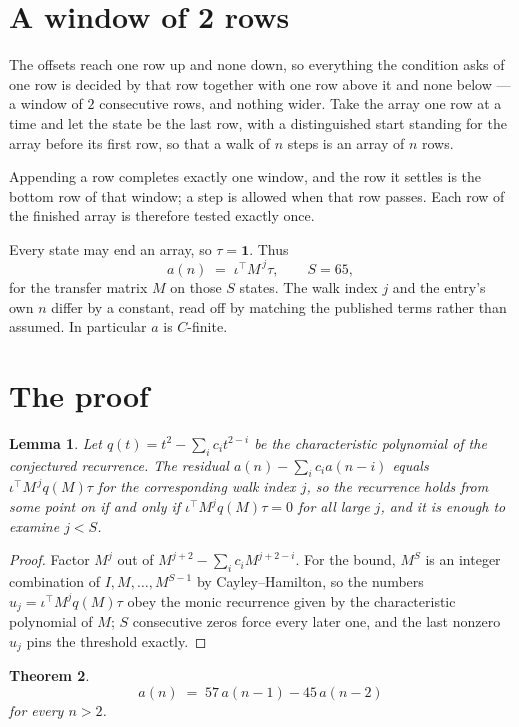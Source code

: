 \documentclass[11pt,a4paper]{article}
\theoremstyle{plain}
\newtheorem{theorem}{Theorem}
\newtheorem{lemma}[theorem]{Lemma}
\theoremstyle{definition}
\begin{document}
\section{A window of 2 rows}

The offsets reach one row up and none down, so everything the condition asks of one row is
decided by that row together with one row above it and none below --- a window of
$2$ consecutive rows, and nothing wider. Take the array one row at a time
and let the state be the last row, with a distinguished start standing for the
array before its first row, so that a walk of $n$ steps is an array of $n$ rows.

Appending a row completes exactly one window, and the row it settles is the bottom row of that window; a step is
allowed when that row passes. Each row of the finished
array is therefore tested exactly once.

Every state may end an array, so $\tau=\mathbf{1}$.
Thus
\[
a(n)\;=\;\iota^{\!\top}M^{\,j}\tau ,\qquad S=65,
\]
for the transfer matrix $M$ on those $S$ states. The walk index $j$ and the entry's own $n$
differ by a constant, read off by matching the published terms rather than assumed. In
particular $a$ is $C$-finite.

\section{The proof}

\begin{lemma}\label{lem:crit}
Let $q(t)=t^{2}-\sum_i c_it^{2-i}$ be the characteristic polynomial of the
conjectured recurrence. The residual $a(n)-\sum_ic_ia(n-i)$ equals
$\iota^{\!\top}M^{\,j}q(M)\tau$ for the corresponding walk index $j$, so the recurrence
holds from some point on if and only if $\iota^{\!\top}M^{j}q(M)\tau=0$ for all large $j$,
and it is enough to examine $j<S$.
\end{lemma}

\begin{proof}
Factor $M^{j}$ out of $M^{j+2}-\sum_ic_iM^{j+2-i}$. For the bound, $M^{S}$
is an integer combination of $I,M,\dots,M^{S-1}$ by Cayley--Hamilton, so the numbers
$u_j=\iota^{\!\top}M^{j}q(M)\tau$ obey the monic recurrence given by the characteristic
polynomial of $M$; $S$ consecutive zeros force every later one, and the last nonzero $u_j$
pins the threshold exactly.
\end{proof}

\begin{theorem}
\[
a(n)\;=\;57\,a(n-1) - 45\,a(n-2)
\]
for every $n>2$.
\end{theorem}
\end{document}
